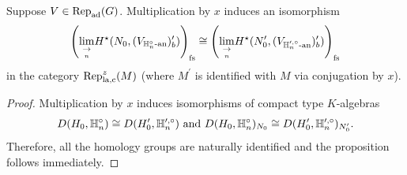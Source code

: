 \documentclass[10pt]{amsart}
\begin{document}
\begin{proposition}
Suppose $V\in\textnormal{Rep}_{\textnormal{ad}}(G)$. Multiplication by $x$ induces an isomorphism \begin{equation}
    \left(\underset{\underset{n}{\rightarrow}}{\lim}H^{\star}(N_{0},(V_{\mathbb{H}_{n}^{\circ}\textnormal{-an}})^{\prime}_{b}) \right)_{\textnormal{fs}} \cong \left(\underset{\underset{n}{\rightarrow}}{\lim}H^{\star}(N_{0}^{\prime},(V_{\mathbb{H}_{n}^{\prime,\circ}\textnormal{-an}})^{\prime}_{b}) \right)_{\textnormal{fs}}
\end{equation} in the category $\textnormal{Rep}_{\textnormal{la,c}}^{z}(M)$ (where $M^{\prime}$ is identified with $M$ via conjugation by $x$). 
\end{proposition}
\begin{proof}
Multiplication by $x$ induces isomorphisms of compact type $K$-algebras \begin{equation*}
    D(H_{0},\mathbb{H}_{n}^{\circ})\cong D(H_{0}^{\prime},\mathbb{H}_{n}^{\prime,\circ}) \textnormal{ and } D(H_{0},\mathbb{H}_{n}^{\circ})_{N_{0}}\cong D(H_{0}^{\prime},\mathbb{H}_{n}^{\prime,\circ})_{N_{0}^{\prime}}. 
\end{equation*} Therefore, all the homology groups are naturally identified and the proposition follows immediately. 
\end{proof}
\end{document}

